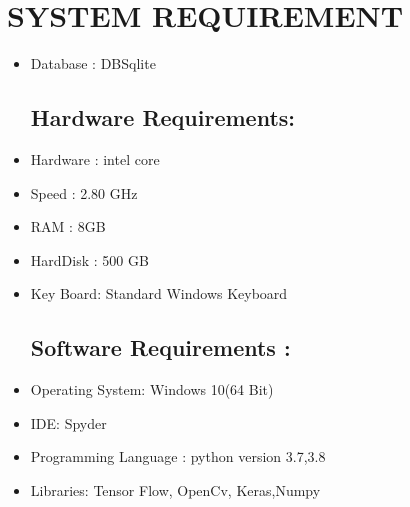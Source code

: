 \documentclass[oneside,a4paper,12pt]{report}
\begin{document}
\section {SYSTEM REQUIREMENT}
\begin{itemize}
  \subsection{Database Requirements :}
  \item Database : DBSqlite

 \subsection {Hardware Requirements:}
 \item Hardware : intel core\\
 \item Speed : 2.80 GHz\\
 \item RAM : 8GB\\
 \item HardDisk : 500 GB\\
 \item  Key Board: Standard Windows Keyboard
 
 \subsection {Software Requirements :}
\item  Operating System: Windows 10(64 Bit)\\
\item IDE: Spyder\\
\item Programming Language : python version 3.7,3.8\\
\item Libraries: Tensor Flow, OpenCv, Keras,Numpy\\


\end{itemize}
\end{document}
